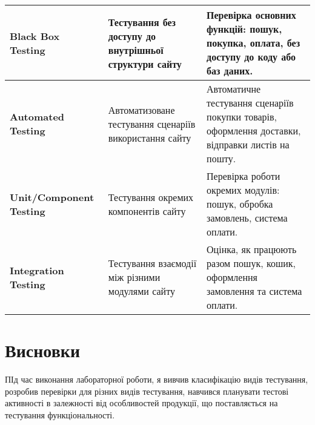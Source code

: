 \documentclass[oneside,14pt]{extarticle}
\begin{document}
\begin{normalsize}
\begin{longtable}{|p{4.5cm}|p{5cm}|p{7cm}|}
		\hline
		\textbf{Black Box Testing} & Тестування без доступу до внутрішньої структури сайту & Перевірка основних функцій: пошук, покупка, оплата, без доступу до коду або баз даних. \\
		\hline
		\textbf{Automated Testing} & Автоматизоване тестування сценаріїв використання сайту & Автоматичне тестування сценаріїв покупки товарів, оформлення доставки, відправки листів на пошту. \\
		\hline
		\textbf{Unit/Component Testing} & Тестування окремих компонентів сайту & Перевірка роботи окремих модулів: пошук, обробка замовлень, система оплати. \\
		\hline
		\textbf{Integration Testing} & Тестування взаємодії між різними модулями сайту & Оцінка, як працюють разом пошук, кошик, оформлення замовлення та система оплати. \\
		\hline
	\end{longtable}
	
	\section*{Висновки}
	ПІд час виконання лабораторної роботи, я вивчив класифікацію видів тестування, розробив перевірки для різних видів тестування, навчився планувати тестові активності в залежності від особливостей продукції, що поставляється на тестування 	функціональності.
	    
\end{normalsize}
\end{document}
